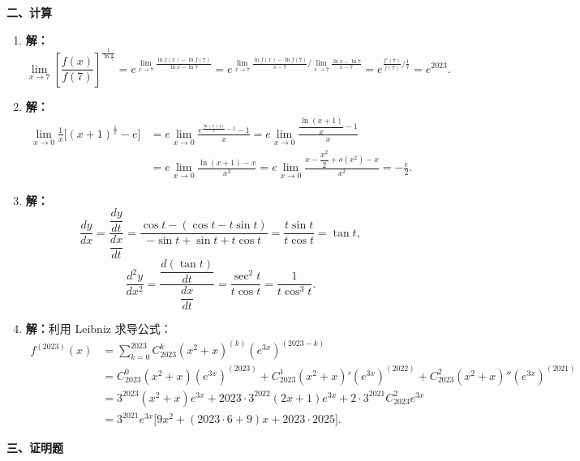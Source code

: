\documentclass[a4paper,11pt]{ctexart}
\begin{document}
\vspace{0.6em}
\textbf{二、计算}

\begin{enumerate}[label=\arabic*., start=8, leftmargin=2em, itemsep=0.9em, topsep=0.4em]
  \item \textbf{解：}
  \[
    \lim_{x\to 7}\left[\frac{f(x)}{f(7)}\right]^{\frac{1}{\ln\frac{x}{7}}}
    = e^{\lim\limits_{x\to 7}\frac{\ln f(x)-\ln f(7)}{\ln x-\ln 7}}
    = e^{\lim\limits_{x\to 7}\frac{\ln f(x)-\ln f(7)}{x-7}\big/\lim\limits_{x\to 7}\frac{\ln x-\ln 7}{x-7}}
    = e^{\frac{f'(7)}{f(7)}\big/\frac{1}{7}}
    = e^{2023}.
  \]

  \item \textbf{解：}
  \begin{align*}
    \lim_{x\to 0}\frac{1}{x}\bigl[(x+1)^{\frac{1}{x}}-e\bigr]
    &= e\lim_{x\to 0}\frac{e^{\frac{\ln(x+1)}{x}-1}-1}{x}
    = e\lim_{x\to 0}\frac{\dfrac{\ln(x+1)}{x}-1}{x} \\
    &= e\lim_{x\to 0}\frac{\ln(x+1)-x}{x^2}
    = e\lim_{x\to 0}\frac{x-\dfrac{x^2}{2}+o(x^2)-x}{x^2}
    = -\frac{e}{2}.
  \end{align*}

  \item \textbf{解：}
  \[
    \frac{dy}{dx}=\frac{\dfrac{dy}{dt}}{\dfrac{dx}{dt}}=\frac{\cos t-(\cos t-t\sin t)}{-\sin t+\sin t+t\cos t}=\frac{t\sin t}{t\cos t}=\tan t,
  \]
  \[
    \frac{d^2y}{dx^2}=\frac{\dfrac{d(\tan t)}{dt}}{\dfrac{dx}{dt}}=\frac{\sec^2 t}{t\cos t}=\frac{1}{t\cos^3 t}.
  \]

  \item \textbf{解：}利用 Leibniz 求导公式：
  \begin{align*}
    f^{(2023)}(x)
    &= \sum_{k=0}^{2023} C_{2023}^k (x^2+x)^{(k)}(e^{3x})^{(2023-k)} \\
    &= C_{2023}^0 (x^2+x)(e^{3x})^{(2023)} + C_{2023}^1 (x^2+x)'(e^{3x})^{(2022)} + C_{2023}^2 (x^2+x)''(e^{3x})^{(2021)} \\
    &= 3^{2023}(x^2+x)e^{3x} + 2023\cdot 3^{2022}(2x+1)e^{3x} + 2\cdot 3^{2021} C_{2023}^2 e^{3x} \\
    &= 3^{2021}e^{3x}\bigl[9x^2+(2023\cdot 6+9)x+2023\cdot 2025\bigr].
  \end{align*}
\end{enumerate}

\vspace{0.6em}
\textbf{三、证明题}
\end{document}
